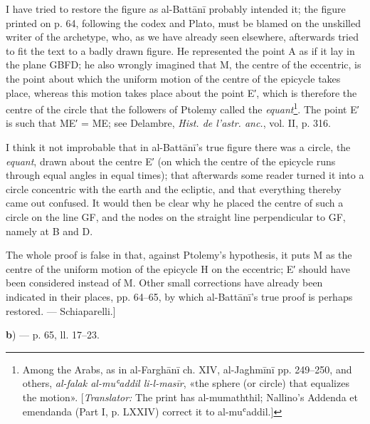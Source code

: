 \documentclass[11pt]{article}
\newcommand{\Pg}[1]{\marginpar{\footnotesize\color{gray}#1}}
\begin{document}
\par I have tried to restore the figure as al-Battānī probably intended it; the figure printed on p. 64, following the codex and Plato, must be blamed on the unskilled writer of the archetype, who, as we have already seen elsewhere, afterwards tried to fit the text to a badly drawn figure. He represented the point A as if it lay in the plane GBFD; he also wrongly imagined that M, the centre of the eccentric, is the point about which the uniform motion of the centre of the epicycle takes place, whereas this motion takes place about the point E′, which is therefore the centre of the circle that the followers of Ptolemy called the \emph{equant}\footnote{Among the Arabs, as in al-Farghānī ch. XIV, al-Jaghmīnī pp. 249–250, and others, \emph{al-falak al-muʿaddil li-l-masīr}, «the sphere (or circle) that equalizes the motion». [\emph{Translator:} The print has al-mumaththil; Nallino's Addenda et emendanda (Part I, p. LXXIV) correct it to al-muʿaddil.]}. The point E′ is such that ME′ = ME; see Delambre, \emph{Hist. de l’astr. anc.}, vol. II, p. 316.\par
\par I think it not improbable that in al-Battānī's true figure there was a circle, the \emph{equant}, drawn about the centre E′ (on which the centre of the epicycle runs through equal angles in equal times); that afterwards some reader turned it into a circle concentric with the earth and the ecliptic, and that everything thereby came out confused. It would then be clear why he placed the centre of such a circle on the line GF, and the nodes on the straight line perpendicular to GF, namely at B and D.\par
\par \Pg{I 238}The whole proof is false in that, against Ptolemy's hypothesis, it puts M as the centre of the uniform motion of the epicycle H on the eccentric; E′ should have been considered instead of M. Other small corrections have already been indicated in their places, pp. 64–65, by which al-Battānī's true proof is perhaps restored. — Schiaparelli.]\par
\par\begin{center}\textbf{b}) — p. 65, ll. 17–23.\end{center}
\end{document}
